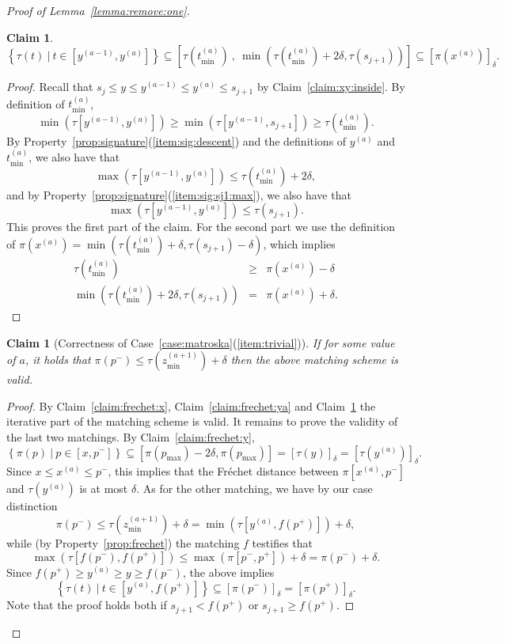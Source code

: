 \documentclass[11pt, letter]{article}
\newtheorem{claim}[theorem]{Claim}
\newcommand{\lemref}[1]{Lemma~\ref{lemma:#1}}
\newcommand{\caseref}[1]{Case~\ref{case:#1}}
\newcommand{\claimlab}[1]{\label{claim:#1}}
\newcommand{\claimref}[1]{Claim~\ref{claim:#1}}
\newcommand{\propref}[1]{Property~\ref{prop:#1}}
\newcommand{\Frechet}{Fr\'echet\xspace}
\providecommand{\brc}[1]{\left\{ {#1} \right\}}
\newcommand{\pbrc}[1]{\left[ {#1} \right]}
\newcommand{\setSubC}[4]{\ensuremath{\brc{ #1(#2) ~|~ #2 \in [#3,#4]} }}
\newcommand{\range}[2]{\ensuremath{[#1]_{#2}}}
\newcommand{\minSubC}[4]{\ensuremath{\min( #1[#3,#4])}}
\newcommand{\maxSubC}[4]{\ensuremath{\max( #1[#3,#4])}}
\begin{document}
\begin{proof}[Proof of \lemref{remove:one}]
\begin{claim}
$\setSubC{\tau}{t}{y^{(a-1)}}{y^{(a)}} \subseteq \pbrc{\tau(t_{\min}^{(a)})
~,~  \min(\tau(t_{\min}^{(a)}) + 2\delta, \tau(s_{j+1})  )}
\subseteq \range{\pi(x^{(a)})}{\delta}.$
\claimlab{frechet:xa}
\end{claim}
\begin{proof}
Recall that $s_j \leq y \leq y^{(a-1)} \leq y^{(a)} \leq s_{j+1}$ by
\claimref{xy:inside}.
By definition of $t_{\min}^{(a)}$,
\[ \minSubC{\tau}{t}{y^{(a-1)}}{y^{(a)}} \geq \minSubC{\tau}{t}{y^{(a-1)}}{s_{j+1}} \geq \tau(t_{\min}^{(a)}). \]
By \propref{signature}(\ref{item:sig:descent}) and the definitions of $y^{(a)}$ and $t_{\min}^{(a)}$, we also have that
\[ \maxSubC{\tau}{t}{y^{(a-1)}}{y^{(a)}} \leq  \tau(t_{\min}^{(a)}) + 2\delta, \]
and by \propref{signature}(\ref{item:sig:sj1:max}), we also have that
\[ \maxSubC{\tau}{t}{y^{(a-1)}}{y^{(a)}} \leq \tau(s_{j+1}). \]
This proves the first part of the claim. For the second part we use the definition of $\pi(x^{(a)}) = \min(\tau(t_{\min}^{(a)})+\delta,
\tau(s_{j+1})-\delta)$, which implies
\begin{eqnarray*} 
\tau(t_{\min}^{(a)}) &\geq & \pi(x^{(a)}) - \delta\\
\min(\tau(t_{\min}^{(a)}) + 2\delta, \tau(s_{j+1})) &=& \pi(x^{(a)}) + \delta.
\end{eqnarray*}
\end{proof}



\begin{claim}[Correctness of \caseref{matroska}(\ref{item:trivial})]
If for some value of $a$, it holds that 
$\pi(p^{-}) \leq \tau(z_{\min}^{(a+1)}) + \delta$ then
the above matching scheme is valid.
\claimlab{trivial:subcase}
\end{claim}

\begin{proof}
By \claimref{frechet:x}, \claimref{frechet:ya} and \claimref{frechet:xa} the
iterative part of the matching scheme is valid.
It remains to prove the validity of the last two matchings.
By \claimref{frechet:y},
\[\setSubC{\pi}{p}{x}{p^{-}} \subseteq  [\pi(p_{\max}) -2\delta, \pi(p_{\max})] =
\range{\tau(y)}{\delta} = \range{\tau(y^{(a)})}{\delta}.\]
Since $x \leq x^{(a)} \leq p^{-}$, this implies that the \Frechet distance
between $\pi[x^{(a)},p^{-}]$ and $\tau(y^{(a)})$ is at most $\delta$.
As for the other matching, we have by our case distinction 
\[\pi(p^{-}) \leq \tau(z_{\min}^{(a+1)}) + \delta = \minSubC{\tau}{t}{y^{(a)}}{f(p^{+})} + \delta,\]
while (by \propref{frechet}) the matching $f$ testifies that
\[\maxSubC{\tau}{t}{f(p^{-})}{f(p^{+})} \leq
\maxSubC{\pi}{p}{p^{-}}{p^{+}} + \delta = \pi(p^{-}) + \delta.\]
Since $f(p^{+}) \geq y^{(a)} \geq y \geq f(p^{-})$, the above implies
\[\setSubC{\tau}{t}{y^{(a)}}{f(p^{+})} \subseteq \range{\pi(p^{-})}{\delta} = \range{\pi(p^{+})}{\delta}.\]
Note that the proof holds both if $s_{j+1} < f(p^{+})$ or $s_{j+1} \geq f(p^{+})$.
\end{proof}


\end{proof}
\end{document}
